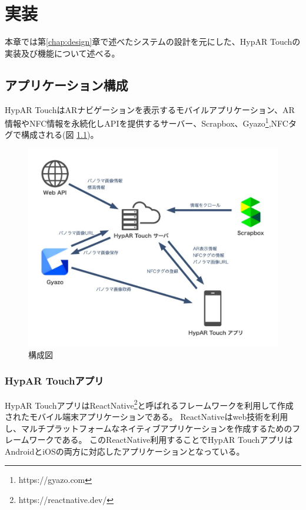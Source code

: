 \chapter{実装}
\label{chap:implementation}

本章では第\ref{chap:design}章で述べたシステムの設計を元にした、HypAR Touchの実装及び機能について述べる。

\newpage

\section{アプリケーション構成}
HypAR TouchはARナビゲーションを表示するモバイルアプリケーション、AR情報やNFC情報を永続化しAPIを提供するサーバー、Scrapbox、Gyazo\footnote{\textsf{https://gyazo.com}},NFCタグで構成される(図 \ref{fig:application_structure})。

\begin{figure}[h]
  \centering
  \includegraphics[width=150mm]{images/application_structure.jpg}
  \caption{構成図} \label{fig:application_structure}
\end{figure}

\subsection{HypAR Touchアプリ}
HypAR TouchアプリはReactNative\footnote{\textsf{https://reactnative.dev/}}と呼ばれるフレームワークを利用して作成されたモバイル端末アプリケーションである。
ReactNativeはweb技術を利用し、マルチプラットフォームなネイティブアプリケーションを作成するためのフレームワークである。
このReactNative利用することでHypAR TouchアプリはAndroidとiOSの両方に対応したアプリケーションとなっている。

